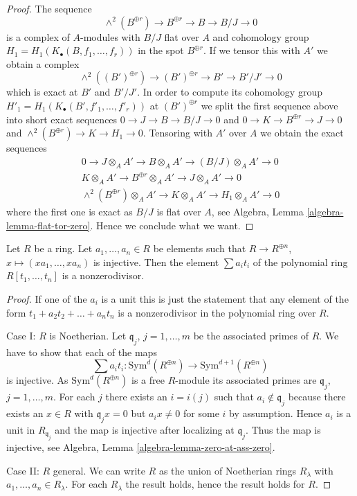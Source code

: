 \begin{proof}
The sequence
$$
\wedge^2(B^{\oplus r}) \to B^{\oplus r} \to B \to B/J \to 0
$$
is a complex of $A$-modules with $B/J$ flat over $A$ and
cohomology group $H_1 = H_1(K_\bullet(B, f_1, \ldots, f_r))$ in the spot
$B^{\oplus r}$. If we tensor this with $A'$ we obtain a complex
$$
\wedge^2((B')^{\oplus r}) \to (B')^{\oplus r} \to B' \to B'/J' \to 0
$$
which is exact at $B'$ and $B'/J'$. In order to compute its
cohomology group $H'_1 = H_1(K_\bullet(B', f'_1, \ldots, f'_r))$
at $(B')^{\oplus r}$ we split the first sequence above into
short exact sequences
$0 \to J \to B \to B/J \to 0$ and
$0 \to K \to B^{\oplus r} \to J \to 0$ and
$\wedge^2(B^{\oplus r}) \to K \to H_1 \to 0$.
Tensoring with $A'$ over $A$ we obtain the exact sequences
$$
\begin{matrix}
0 \to J \otimes_A A' \to B \otimes_A A' \to (B/J) \otimes_A A' \to 0 \\
K \otimes_A A' \to B^{\oplus r} \otimes_A A' \to J \otimes_A A' \to 0 \\
\wedge^2(B^{\oplus r}) \otimes_A A' \to K \otimes_A A' \to H_1 \otimes_A A'
\to 0
\end{matrix}
$$
where the first one is exact as $B/J$ is flat over $A$, see
Algebra, Lemma \ref{algebra-lemma-flat-tor-zero}.
Hence we conclude what we want.
\end{proof}

\begin{lemma}
\label{lemma-make-nonzero-divisor}
Let $R$ be a ring. Let $a_1, \ldots, a_n \in R$ be elements such
that $R \to R^{\oplus n}$, $x \mapsto (xa_1, \ldots, xa_n)$ is injective.
Then the element $\sum a_i t_i$ of the polynomial ring $R[t_1, \ldots, t_n]$
is a nonzerodivisor.
\end{lemma}

\begin{proof}
If one of the $a_i$ is a unit this is just the statement that any
element of the form $t_1 + a_2 t_2 + \ldots + a_n t_n$ is a nonzerodivisor
in the polynomial ring over $R$.

\medskip\noindent
Case I: $R$ is Noetherian. Let $\mathfrak q_j$, $j = 1, \ldots, m$
be the associated primes of $R$. We have to show that
each of the maps
$$
\sum a_i t_i :
\text{Sym}^d(R^{\oplus n})
\longrightarrow
\text{Sym}^{d + 1}(R^{\oplus n})
$$
is injective. As $\text{Sym}^d(R^{\oplus n})$ is a free $R$-module its
associated primes are $\mathfrak q_j$, $j = 1, \ldots, m$. For each $j$
there exists an $i = i(j)$ such that $a_i \not \in \mathfrak q_j$ because
there exists an $x \in R$ with $\mathfrak q_jx = 0$ but $a_i x \not = 0$
for some $i$ by assumption. Hence $a_i$ is a unit in $R_{\mathfrak q_j}$
and the map is injective after localizing at $\mathfrak q_j$. Thus the map
is injective, see
Algebra, Lemma \ref{algebra-lemma-zero-at-ass-zero}.

\medskip\noindent
Case II: $R$ general. We can write $R$ as the union of Noetherian
rings $R_\lambda$ with $a_1, \ldots, a_n \in R_\lambda$. For each $R_\lambda$
the result holds, hence the result holds for $R$.
\end{proof}

